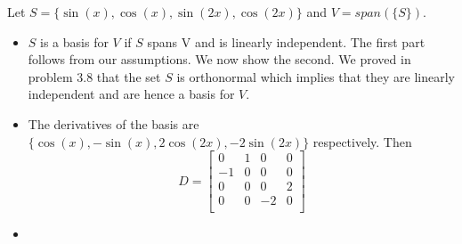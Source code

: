 \documentclass[12pt]{article}
\newenvironment{problem}[2][Problem]{\begin{trivlist}
\item[\hskip \labelsep {\bfseries #1}\hskip \labelsep {\bfseries #2}]}{\end{trivlist}}
\begin{document}
\begin{problem}{8.} Let $S = \{\sin(x), \cos(x), \sin(2x), \cos(2x) \}$ and $V = span(\{S\})$. 
\begin{itemize}
\item [(i)] $S$ is a basis for $V$ if $S$ spans V and is linearly independent. The first part follows from our assumptions. We now show the second. We proved in problem 3.8 that the set $S$ is orthonormal which implies that they are linearly independent and are hence a basis for $V$. 
\item [(ii)] The derivatives of the basis are $\{\cos(x), -\sin(x), 2\cos(2x), -2\sin(2x)\}$ respectively. Then \[D=
  \left[ {\begin{array}{cccc}
   0 & 1 & 0 & 0\\
   -1 & 0 & 0 & 0\\
   0 & 0 & 0 & 2\\
   0 & 0 & -2 & 0\\
  \end{array} } \right]
\]
\item [(iii)]
\end{itemize}
\end{problem}

\begin{problem}{13.} 
\end{problem}

\begin{problem}{15.} 
\end{problem}

\begin{problem}{16.} 
\end{problem}

\begin{problem}{18.} 
\end{problem}

\begin{problem}{20.} 
\end{problem}

\begin{problem}{24.} 
\end{problem}

\begin{problem}{25.}
\end{problem}

\begin{problem}{27.} 
\end{problem}

 
\begin{problem}{28.} 
\end{problem}


\begin{problem}{31.} 
\end{problem}


\begin{problem}{32.}
\end{problem}

\begin{problem}{33.} 
\end{problem}

\begin{problem}{36.} 
\end{problem}

\begin{problem}{38.} 
\end{problem}
\end{document}
